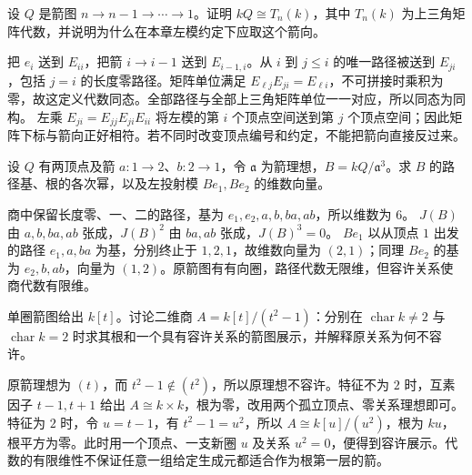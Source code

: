 \begin{exercise}\label{b5:ex:09-triangular-all-sizes}
	设 \(Q\) 是箭图 \(n\to n-1\to\cdots\to1\)。证明 \(kQ\cong T_n(k)\)，其中 \(T_n(k)\) 为上三角矩阵代数，并说明为什么在本章左模约定下应取这个箭向。
\end{exercise}
\begin{solution}
	把 \(e_i\) 送到 \(E_{ii}\)，把箭 \(i\to i-1\) 送到 \(E_{i-1,i}\)。从 \(i\) 到 \(j\leq i\) 的唯一路径被送到 \(E_{ji}\)，包括 \(j=i\) 的长度零路径。矩阵单位满足 \(E_{\ell j}E_{ji}=E_{\ell i}\)，不可拼接时乘积为零，故这定义代数同态。全部路径与全部上三角矩阵单位一一对应，所以同态为同构。 左乘 \(E_{ji}=E_{jj}E_{ji}E_{ii}\) 将左模的第 \(i\) 个顶点空间送到第 \(j\) 个顶点空间；因此矩阵下标与箭向正好相符。若不同时改变顶点编号和约定，不能把箭向直接反过来。
\end{solution}

\begin{exercise}\label{b5:ex:09-truncated-cycle}
	设 \(Q\) 有两顶点及箭 \(a:1\to2\)、\(b:2\to1\)，令 \(\mathfrak a\) 为箭理想，\(B=kQ/\mathfrak a^3\)。求 \(B\) 的路径基、根的各次幂，以及左投射模 \(Be_1,Be_2\) 的维数向量。
\end{exercise}
\begin{solution}
	商中保留长度零、一、二的路径，基为 \(e_1,e_2,a,b,ba,ab\)，所以维数为 \(6\)。 \(J(B)\) 由 \(a,b,ba,ab\) 张成，\(J(B)^2\) 由 \(ba,ab\) 张成，\(J(B)^3=0\)。 \(Be_1\) 以从顶点 \(1\) 出发的路径 \(e_1,a,ba\) 为基，分别终止于 \(1,2,1\)，故维数向量为 \((2,1)\)；同理 \(Be_2\) 的基为 \(e_2,b,ab\)，向量为 \((1,2)\)。原箭图有有向圈，路径代数无限维，但容许关系使商代数有限维。
\end{solution}

\begin{exercise}\label{b5:ex:09-nonadmissible-square}
	单圈箭图给出 \(k[t]\)。讨论二维商 \(A=k[t]/(t^2-1)\)：分别在 \(\operatorname{char}k\neq2\) 与 \(\operatorname{char}k=2\) 时求其根和一个具有容许关系的箭图展示，并解释原关系为何不容许。
\end{exercise}
\begin{solution}
	原箭理想为 \((t)\)，而 \(t^2-1\notin(t^2)\)，所以原理想不容许。特征不为 \(2\) 时，互素因子 \(t-1,t+1\) 给出 \(A\cong k\times k\)，根为零，改用两个孤立顶点、零关系理想即可。 特征为 \(2\) 时，令 \(u=t-1\)，有 \(t^2-1=u^2\)，所以 \(A\cong k[u]/(u^2)\)，根为 \(ku\)，根平方为零。此时用一个顶点、一支新圈 \(u\) 及关系 \(u^2=0\)，便得到容许展示。代数的有限维性不保证任意一组给定生成元都适合作为根第一层的箭。
\end{solution}


